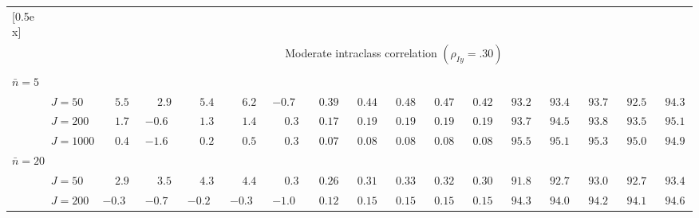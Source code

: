 \begin{sidewaystable}
\begin{threeparttable}
\begin{tabular}{llccccccccccccccc}
[0.5ex]\hline\\[-1.6ex] 
& & \multicolumn{15}{c}{Moderate intraclass correlation $(\rho_{Iy}=.30)$} \\[0.6ex]\hline\\[-1.8ex]
\multicolumn{4}{l}{$\bar{n}=5$} \\  & \nopagebreak $\;J=50$  & $\phantom{-}5.5\phantom{0}$ & $\phantom{-}2.9\phantom{0}$ & $\phantom{-}5.4\phantom{0}$ & $\phantom{-}6.2\phantom{0}$ & ${-}0.7\phantom{0}$ & $\phantom{0}0.39\phantom{0}$ & $\phantom{0}0.44\phantom{0}$ & $\phantom{0}0.48\phantom{0}$ & $\phantom{0}0.47\phantom{0}$ & $\phantom{0}0.42\phantom{0}$ & $\phantom{0}93.2\phantom{0}$ & $\phantom{0}93.4\phantom{0}$ & $\phantom{0}93.7\phantom{0}$ & $\phantom{0}92.5\phantom{0}$ & $\phantom{0}94.3\phantom{0}$ \\
 & \nopagebreak $\;J=200$  & $\phantom{-}1.7\phantom{0}$ & ${-}0.6\phantom{0}$ & $\phantom{-}1.3\phantom{0}$ & $\phantom{-}1.4\phantom{0}$ & $\phantom{-}0.3\phantom{0}$ & $\phantom{0}0.17\phantom{0}$ & $\phantom{0}0.19\phantom{0}$ & $\phantom{0}0.19\phantom{0}$ & $\phantom{0}0.19\phantom{0}$ & $\phantom{0}0.19\phantom{0}$ & $\phantom{0}93.7\phantom{0}$ & $\phantom{0}94.5\phantom{0}$ & $\phantom{0}93.8\phantom{0}$ & $\phantom{0}93.5\phantom{0}$ & $\phantom{0}95.1\phantom{0}$ \\
 & \nopagebreak $\;J=1000$  & $\phantom{-}0.4\phantom{0}$ & ${-}1.6\phantom{0}$ & $\phantom{-}0.2\phantom{0}$ & $\phantom{-}0.5\phantom{0}$ & $\phantom{-}0.3\phantom{0}$ & $\phantom{0}0.07\phantom{0}$ & $\phantom{0}0.08\phantom{0}$ & $\phantom{0}0.08\phantom{0}$ & $\phantom{0}0.08\phantom{0}$ & $\phantom{0}0.08\phantom{0}$ & $\phantom{0}95.5\phantom{0}$ & $\phantom{0}95.1\phantom{0}$ & $\phantom{0}95.3\phantom{0}$ & $\phantom{0}95.0\phantom{0}$ & $\phantom{0}94.9\phantom{0}$ \\
\multicolumn{4}{l}{$\bar{n}=20$} \\  & \nopagebreak $\;J=50$  & $\phantom{-}2.9\phantom{0}$ & $\phantom{-}3.5\phantom{0}$ & $\phantom{-}4.3\phantom{0}$ & $\phantom{-}4.4\phantom{0}$ & $\phantom{-}0.3\phantom{0}$ & $\phantom{0}0.26\phantom{0}$ & $\phantom{0}0.31\phantom{0}$ & $\phantom{0}0.33\phantom{0}$ & $\phantom{0}0.32\phantom{0}$ & $\phantom{0}0.30\phantom{0}$ & $\phantom{0}91.8\phantom{0}$ & $\phantom{0}92.7\phantom{0}$ & $\phantom{0}93.0\phantom{0}$ & $\phantom{0}92.7\phantom{0}$ & $\phantom{0}93.4\phantom{0}$ \\
 & \nopagebreak $\;J=200$  & ${-}0.3\phantom{0}$ & ${-}0.7\phantom{0}$ & ${-}0.2\phantom{0}$ & ${-}0.3\phantom{0}$ & ${-}1.0\phantom{0}$ & $\phantom{0}0.12\phantom{0}$ & $\phantom{0}0.15\phantom{0}$ & $\phantom{0}0.15\phantom{0}$ & $\phantom{0}0.15\phantom{0}$ & $\phantom{0}0.15\phantom{0}$ & $\phantom{0}94.3\phantom{0}$ & $\phantom{0}94.0\phantom{0}$ & $\phantom{0}94.2\phantom{0}$ & $\phantom{0}94.1\phantom{0}$ & $\phantom{0}94.6\phantom{0}$ \\

\end{tabular}
\end{threeparttable}
\end{sidewaystable}
